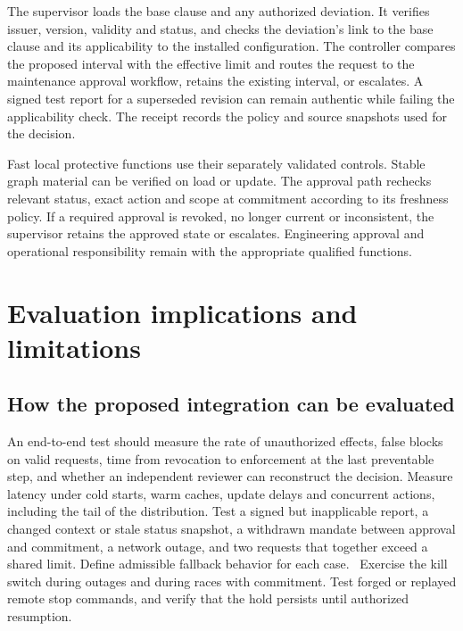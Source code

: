 The supervisor loads the base clause and any authorized deviation. It verifies issuer, version, validity and status, and checks the deviation's link to the base clause and its applicability to the installed configuration. The controller compares the proposed interval with the effective limit and routes the request to the maintenance approval workflow, retains the existing interval, or escalates. A signed test report for a superseded revision can remain authentic while failing the applicability check. The receipt records the policy and source snapshots used for the decision.~\cite{src5,src6,src8}

Fast local protective functions use their separately validated controls. Stable graph material can be verified on load or update. The approval path rechecks relevant status, exact action and scope at commitment according to its freshness policy. If a required approval is revoked, no longer current or inconsistent, the supervisor retains the approved state or escalates. Engineering approval and operational responsibility remain with the appropriate qualified functions.~\cite{src6,src7,src15,src16}

\FloatBarrier

\section{Evaluation implications and limitations}
\label{sec:evaluation}

\subsection{How the proposed integration can be evaluated}

An end-to-end test should measure the rate of unauthorized effects, false blocks on valid requests, time from revocation to enforcement at the last preventable step, and whether an independent reviewer can reconstruct the decision. Measure latency under cold starts, warm caches, update delays and concurrent actions, including the tail of the distribution. Test a signed but inapplicable report, a changed context or stale status snapshot, a withdrawn mandate between approval and commitment, a network outage, and two requests that together exceed a shared limit. Define admissible fallback behavior for each case.~\cite{src5,src6,src7} Exercise the kill switch during outages and during races with commitment. Test forged or replayed remote stop commands, and verify that the hold persists until authorized resumption.

